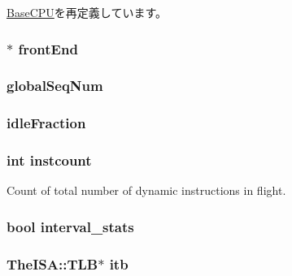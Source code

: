 \hyperlink{classBaseCPU_a6be3ef152e982fb57e224c4a32a431b7}{BaseCPU}を再定義しています。\hypertarget{classOzoneCPU_a67c762418bb2017cb2dce5a0c94f0788}{
\subsubsection[{frontEnd}]{$\ast$ {\bf frontEnd}}}
\label{classOzoneCPU_a67c762418bb2017cb2dce5a0c94f0788}
\hypertarget{classOzoneCPU_a5f72a799d8b189b4fccda3cde457145e}{
\subsubsection[{globalSeqNum}]{ {\bf globalSeqNum}}}
\label{classOzoneCPU_a5f72a799d8b189b4fccda3cde457145e}
\hypertarget{classOzoneCPU_a591131fa4ec30e59631a01f16393430e}{
\subsubsection[{idleFraction}]{ {\bf idleFraction}}}
\label{classOzoneCPU_a591131fa4ec30e59631a01f16393430e}
\hypertarget{classOzoneCPU_a19e374b98940ff65bd4d9d17f198738c}{
\subsubsection[{instcount}]{\setlength{\rightskip}{0pt plus 5cm}int {\bf instcount}}}
\label{classOzoneCPU_a19e374b98940ff65bd4d9d17f198738c}
Count of total number of dynamic instructions in flight. \hypertarget{classOzoneCPU_a60dc78ede18ae1c296442fd0d1cde61b}{
\subsubsection[{interval\_\-stats}]{\setlength{\rightskip}{0pt plus 5cm}bool {\bf interval\_\-stats}}}
\label{classOzoneCPU_a60dc78ede18ae1c296442fd0d1cde61b}
\hypertarget{classOzoneCPU_abcb37ddc11515555d8484702697bc4bb}{
\subsubsection[{itb}]{\setlength{\rightskip}{0pt plus 5cm}TheISA::TLB$\ast$ {\bf itb}}}
\label{classOzoneCPU_abcb37ddc11515555d8484702697bc4bb}


